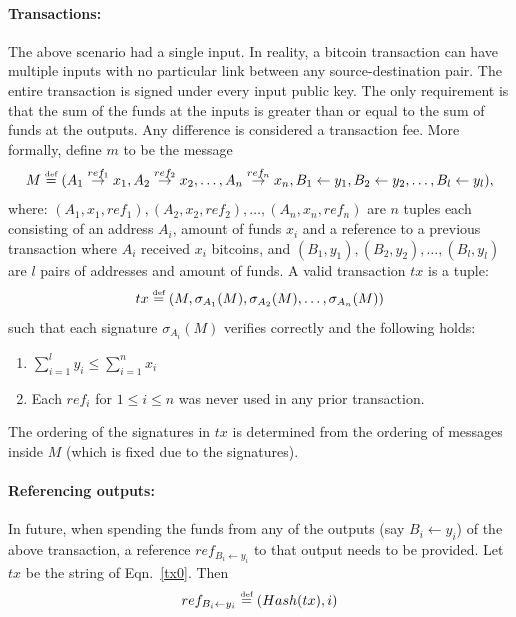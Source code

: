 \documentclass[]{report}   %
\newcommand{\sr}{\stackrel}
\newcommand{\ra}{\rightarrow}
\newcommand{\la}{\leftarrow}
\newcommand{\defined}{\stackrel{\mbox{\tiny{def}}}{=}}
\begin{document}
\paragraph{Transactions:} The above scenario had a single input. In reality, 
a bitcoin transaction can have multiple inputs with no particular link between any source-destination pair. The entire transaction is signed under every input public key. The only requirement is that the sum of the funds at the inputs is greater than or equal to the sum of funds at the outputs. Any difference is considered a transaction fee. More formally, define $m$ to be the message
\[
M \defined (A_1\sr{ref_1}{\ra}x_1, A_2\sr{ref_2}{\ra}x_2, \ldots, A_n\sr{ref_n}{\ra}x_n, B_1\la y_1,
B_2\la y_2, \ldots, B_l\la y_l), 
\] 
where: $(A_1, x_1, ref_1), (A_2, x_2, ref_2),\ldots , (A_n, x_n, ref_n)$ are $n$ tuples each consisting of an address $A_i$, amount of funds $x_i$ and a reference to a previous transaction %
where $A_i$ received $x_i$ bitcoins, and $(B_1, y_1), (B_2, y_2),\ldots, (B_l, y_l)$ are $l$ pairs of addresses and amount of funds. 
A valid transaction $tx$ is a tuple: 
\begin{equation}\label{tx0}tx\defined (M, \sigma_{A_1}(M), \sigma_{A_2}(M), \ldots, \sigma_{A_n}(M))\end{equation} such that each signature $\sigma_{A_i}(M)$ verifies correctly and the following holds:
\begin{enumerate}
	\item $\sum_{i=1}^{l}y_i \leq \sum_{i=1}^{n}x_i$ 
	\item Each $ref_i$ for $1\leq i\leq n$ was never used in any prior transaction.
\end{enumerate}

The ordering of the signatures in $tx$ is determined from the ordering of messages inside $M$ (which is fixed due to the signatures).
\paragraph{Referencing outputs:} In future, when spending the funds from any of the outputs (say $B_i \la y_i$) of the above transaction, a reference $ref_{B_i\la y_i}$ to that output needs to be provided. %
Let $tx$ be the string of Eqn.~\ref{tx0}. Then \[ref_{B_i\la y_i}\defined (Hash(tx), i)\]
\end{document}
